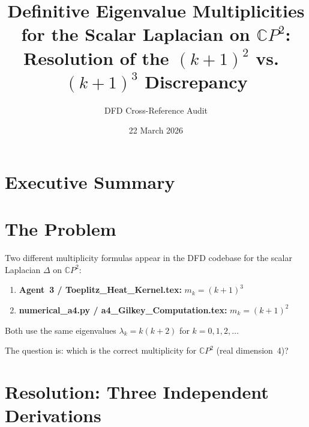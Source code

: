 \documentclass[11pt]{article}
\title{Definitive Eigenvalue Multiplicities for the Scalar Laplacian on
$\mathbb{C}P^2$: Resolution of the $(k{+}1)^2$ vs.\ $(k{+}1)^3$ Discrepancy}
\author{DFD Cross-Reference Audit}
\date{22 March 2026}
\theoremstyle{remark}
\begin{document}
\maketitle

\section{Executive Summary}

\begin{center}
\end{center}

\section{The Problem}

Two different multiplicity formulas appear in the DFD codebase for the scalar
Laplacian $\Delta$ on $\mathbb{C}P^2$:
\begin{enumerate}
\item \textbf{Agent~3 / Toeplitz\_Heat\_Kernel.tex:} $m_k = (k+1)^3$
\item \textbf{numerical\_a4.py / a4\_Gilkey\_Computation.tex:} $m_k = (k+1)^2$
\end{enumerate}
Both use the same eigenvalues $\lambda_k = k(k+2)$ for $k = 0, 1, 2, \ldots$

The question is: which is the correct multiplicity for $\mathbb{C}P^2$
(real dimension~4)?

\section{Resolution: Three Independent Derivations}
\end{document}
